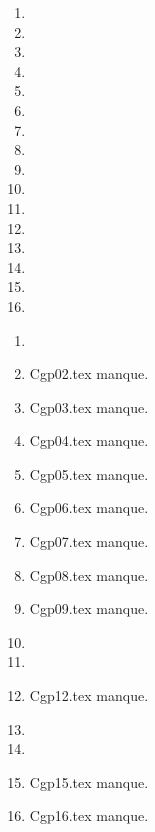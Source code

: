  
 
\begin{enumerate}
  \item  
  \item  
  \item  
  \item  
  \item  
  \item  
  \item  
  \item  
  \item  
  \item  
  \item  
  \item  
  \item  
  \item  
  \item  
  \item  
\end{enumerate} 
\clearpage 
{}
\begin{enumerate}
  \item  
  \item Cgp02.tex manque. 
  \item Cgp03.tex manque. 
  \item Cgp04.tex manque. 
  \item Cgp05.tex manque. 
  \item Cgp06.tex manque. 
  \item Cgp07.tex manque. 
  \item Cgp08.tex manque. 
  \item Cgp09.tex manque. 
  \item  
  \item  
  \item Cgp12.tex manque. 
  \item  
  \item  
  \item Cgp15.tex manque. 
  \item Cgp16.tex manque. 
\end{enumerate} 
